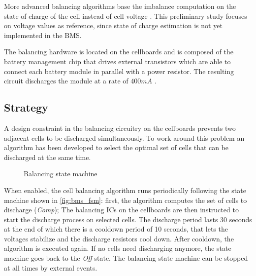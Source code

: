 More advanced balancing algorithms base the imbalance computation on the state of charge of the cell instead of cell voltage \cite{8834858}. This preliminary study focuses on voltage values as reference, since state of charge estimation is not yet implemented in the BMS.

The balancing hardware is located on the cellboards and is composed of the battery management chip that drives external transistors which are able to connect each battery module in parallel with a power resistor. The resulting circuit discharges the module at a rate of $400 mA$ \cite{fenice-bms-hv}.

\subsection{Strategy}
A design constraint in the balancing circuitry on the cellboards prevents two adjacent cells to be discharged simultaneously. To work around this problem an algorithm has been developed to select the optimal set of cells that can be discharged at the same time.

\begin{figure}[h]
    \centering
    
    \caption{Balancing state machine}
    \label{fig:bms_fsm}
\end{figure}

When enabled, the cell balancing algorithm runs periodically following the state machine shown in \autoref{fig:bms_fsm}: first, the algorithm computes the set of cells to discharge (\textit{Comp}); The balancing ICs on the cellboards are then instructed to start the discharge process on selected cells. The discharge period lasts 30 seconds at the end of which there is a cooldown period of 10 seconds, that lets the voltages stabilize and the discharge resistors cool down. After cooldown, the algorithm is executed again. If no cells need discharging anymore, the state machine goes back to the \textit{Off} state. The balancing state machine can be stopped at all times by external events.

